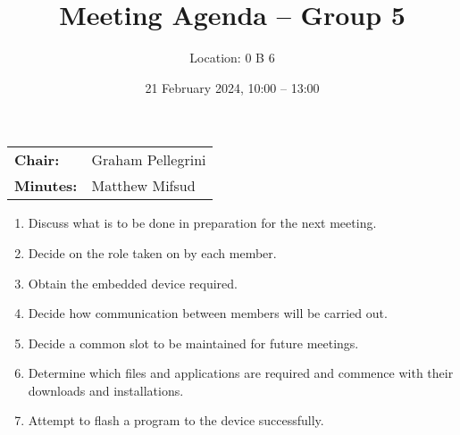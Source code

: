 \documentclass{cce2014-meetings}
\title{Meeting Agenda -- Group 5}
\author{Location: 0 B 6}
\date{21 February 2024, 10:00 -- 13:00}
\begin{document}
\maketitle
\begin{center}
\begin{tabular}{ll}
\textbf{Chair:}   & Graham Pellegrini \\
\textbf{Minutes:} & Matthew Mifsud
\end{tabular}
\end{center}

\begin{enumerate}

\item Discuss what is to be done in preparation for the next meeting.

\item Decide on the role taken on by each member.

\item Obtain the embedded device required.

\item Decide how communication between members will be carried out.

\item Decide a common slot to be maintained for future meetings.

\item Determine which files and applications are required and commence with their downloads and installations.

\item Attempt to flash a program to the device successfully.

\end{enumerate}
\end{document}
